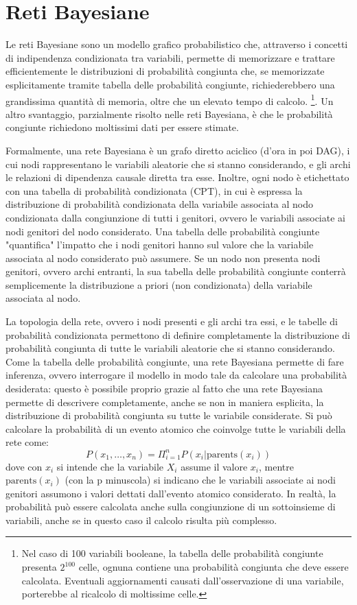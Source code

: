 \chapter{Reti Bayesiane}
Le reti Bayesiane sono un modello grafico probabilistico che,
attraverso i concetti di indipendenza condizionata tra variabili, permette
di memorizzare e trattare efficientemente le distribuzioni di probabilità
congiunta che, se memorizzate esplicitamente tramite tabella delle
probabilità congiunte, richiederebbero una grandissima quantità di memoria,
oltre che un elevato tempo di calcolo.
\footnote{Nel caso di 100 variabili booleane, la tabella delle probabilità
congiunte presenta $2^100$ celle, ognuna contiene una probabilità congiunta
che deve essere calcolata. Eventuali aggiornamenti causati dall'osservazione
di una variabile, porterebbe al ricalcolo di moltissime celle.}.
Un altro svantaggio, parzialmente risolto nelle reti Bayesiana, è che le
probabilità congiunte richiedono moltissimi dati per essere stimate.

Formalmente, una rete Bayesiana è un grafo diretto aciclico (d'ora in poi
DAG), i cui nodi rappresentano le variabili aleatorie che si stanno considerando,
e gli archi le relazioni di dipendenza causale diretta tra esse.
Inoltre, ogni nodo è etichettato con una tabella di probabilità condizionata (CPT),
in cui è espressa la distribuzione di probabilità condizionata della variabile
associata al nodo condizionata dalla congiunzione di tutti i genitori,
ovvero le variabili associate ai nodi genitori del nodo considerato.
Una tabella delle probabilità congiunte "quantifica" l'impatto che i nodi
genitori hanno sul valore che la variabile associata al nodo considerato
può assumere.
Se un nodo non presenta nodi genitori, ovvero archi entranti, la sua tabella
delle probabilità congiunte conterrà semplicemente la distribuzione
a priori (non condizionata) della variabile associata al nodo.

La topologia della rete, ovvero i nodi presenti e gli archi tra essi, e le
tabelle di probabilità condizionata permettono di definire completamente
la distribuzione di probabilità congiunta di tutte le variabili aleatorie
che si stanno considerando.
Come la tabella delle probabilità congiunte, una rete Bayesiana permette di
fare inferenza, ovvero interrogare il modello in modo tale da calcolare una
probabilità desiderata: questo è possibile proprio grazie al fatto che
una rete Bayesiana permette di descrivere completamente, anche se non
in maniera esplicita, la distribuzione di probabilità congiunta su tutte le
variabile considerate.
Si può calcolare la probabilità di un evento atomico che coinvolge tutte
le variabili della rete come:
\[
    P(x_1, \ldots, x_n) = \Pi_{i=1}^{n} P(x_i | \text{parents}(x_i))
\]
dove con $x_i$ si intende che la variabile $X_i$ assume il valore $x_i$,
mentre $\text{parents}(x_i)$ (con la p minuscola) si indicano che
le variabili associate ai nodi genitori assumono i valori dettati
dall'evento atomico considerato.
In realtà, la probabilità può essere calcolata anche sulla congiunzione
di un sottoinsieme di variabili, anche se in questo caso il calcolo risulta
più complesso.

